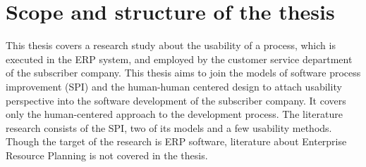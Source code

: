 \documentclass[12pt,a4paper,oneside,pdftex]{report}
\begin{document}

%    
%    
\section{Scope and structure of the thesis}
\label{sec:scope}

This thesis covers a research study about the usability of a process, which is executed in the ERP system, and employed by the customer service department of the subscriber company. This thesis aims to join the models of software process improvement (SPI) and the human-human centered design to attach usability perspective into the software development of the subscriber company. It covers only the human-centered approach to the development process. The literature  research consists of the SPI, two of its models and a few usability methods. Though the target of the research is ERP software, literature about Enterprise Resource Planning is not covered in the thesis.
\end{document}

